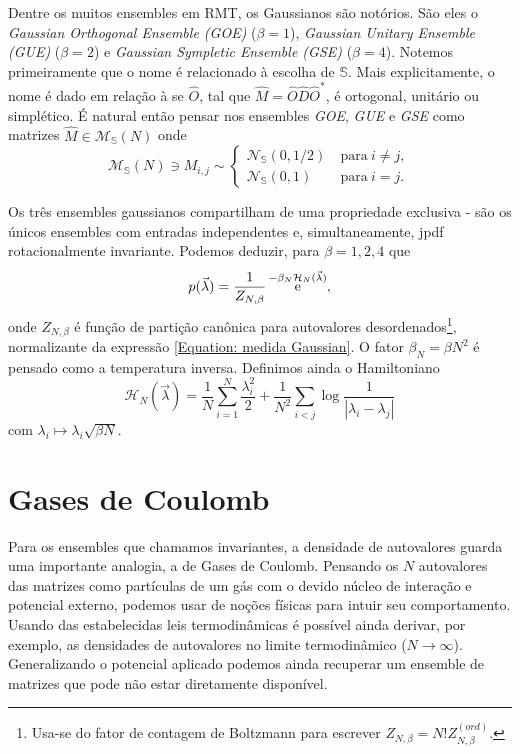\documentclass[11pt,twocolumn]{article}
\newcommand{\matriz}[1]{\hat#1}
\DeclareMathOperator{\ee}{\textrm e}
\newcommand{\p}{p} %
\newcommand{\Se}{\mathbb{S}}
\numberwithin{equation}{section} %
\begin{document}
Dentre os muitos ensembles em RMT, os Gaussianos são notórios. São eles o \textit{Gaussian Orthogonal Ensemble (GOE)} ($\beta=1$), \textit{Gaussian Unitary Ensemble (GUE)} ($\beta=2$) e \textit{Gaussian Sympletic Ensemble (GSE)} ($\beta=4$). Notemos primeiramente que o nome é relacionado à escolha de $\Se$. Mais explicitamente, o nome é dado em relação à se $\matriz{O}$, tal que $\matriz{M} = \matriz{O}\matriz{D}\matriz{O}^*$, é ortogonal, unitário ou simplético. É natural então pensar nos ensembles \textit{GOE}, \textit{GUE} e \textit{GSE} como matrizes $\matriz{M} \in \mathcal{M}_{\Se}(N)$ onde 
$$
\mathcal{M}_{\Se}(N) \ni M_{i,j} \sim
\begin{cases}
	\mathcal{N}_{\Se}(0,1/2) &  \ \text{para} \ i \neq j,\\
	\mathcal{N}_{\Se}(0,1) & \ \text{para} \ i = j.
\end{cases}
$$

Os três ensembles gaussianos compartilham de uma propriedade exclusiva - são os únicos ensembles com entradas independentes e, simultaneamente, jpdf rotacionalmente invariante. Podemos deduzir, para $\beta = 1,2,4$ que
\begin{equation}
	\p(\vec{\lambda}) = \frac{1}{Z_{N, \beta}} \ee^{-\beta_N \mathcal{H}_N(\vec{\lambda})},
	\label{Equation: medida Gaussian}
\end{equation}
onde $Z_{N, \beta}$ é função de partição canônica para autovalores desordenados\footnote{Usa-se do fator de contagem de Boltzmann para escrever $ Z_{N, \beta} = N! Z_{N, \beta}^{(ord)}$.}, normalizante da expressão \ref{Equation: medida Gaussian}. O fator $\beta_N = \beta N^2$ é pensado como a temperatura inversa. Definimos ainda o Hamiltoniano $$\mathcal{H}_N(\vec{\lambda}) = \frac{1}{N}\sum_{i = 1}^{N} \frac{\lambda_i^2}{2} + \frac{1}{N^2} \sum_{i < j} \log{\frac{1}{|\lambda_i - \lambda_j|}}$$ com  $\lambda_i \mapsto \lambda_i \sqrt{\beta N}$.

\section{Gases de Coulomb}

Para os ensembles que chamamos invariantes, a densidade de autovalores guarda uma importante analogia, a de Gases de Coulomb. Pensando os $N$ autovalores das matrizes como partículas de um gás com o devido núcleo de interação e potencial externo, podemos usar de noções físicas para intuir seu comportamento. Usando das estabelecidas leis termodinâmicas é possível ainda derivar, por exemplo, as densidades de autovalores no limite termodinâmico ($N \rightarrow \infty$). Generalizando o potencial aplicado podemos ainda recuperar um ensemble de matrizes que pode não estar diretamente disponível.
\end{document}
